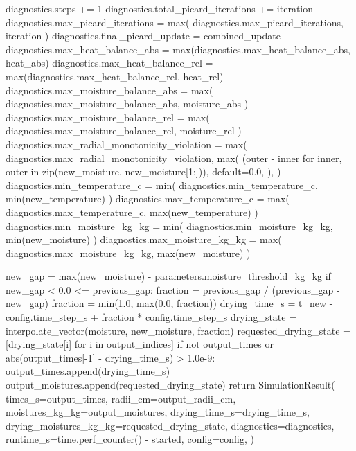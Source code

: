 \documentclass[withoutpreface,bwprint]{cumcmthesis}
\begin{document}
\begin{PythonCode}
        diagnostics.steps += 1
        diagnostics.total_picard_iterations += iteration
        diagnostics.max_picard_iterations = max(
            diagnostics.max_picard_iterations, iteration
        )
        diagnostics.final_picard_update = combined_update
        diagnostics.max_heat_balance_abs = max(diagnostics.max_heat_balance_abs, heat_abs)
        diagnostics.max_heat_balance_rel = max(diagnostics.max_heat_balance_rel, heat_rel)
        diagnostics.max_moisture_balance_abs = max(
            diagnostics.max_moisture_balance_abs, moisture_abs
        )
        diagnostics.max_moisture_balance_rel = max(
            diagnostics.max_moisture_balance_rel, moisture_rel
        )
        diagnostics.max_radial_monotonicity_violation = max(
            diagnostics.max_radial_monotonicity_violation,
            max(
                (outer - inner for inner, outer in zip(new_moisture, new_moisture[1:])),
                default=0.0,
            ),
        )
        diagnostics.min_temperature_c = min(
            diagnostics.min_temperature_c, min(new_temperature)
        )
        diagnostics.max_temperature_c = max(
            diagnostics.max_temperature_c, max(new_temperature)
        )
        diagnostics.min_moisture_kg_kg = min(
            diagnostics.min_moisture_kg_kg, min(new_moisture)
        )
        diagnostics.max_moisture_kg_kg = max(
            diagnostics.max_moisture_kg_kg, max(new_moisture)
        )

        new_gap = max(new_moisture) - parameters.moisture_threshold_kg_kg
        if new_gap < 0.0 <= previous_gap:
            fraction = previous_gap / (previous_gap - new_gap)
            fraction = min(1.0, max(0.0, fraction))
            drying_time_s = t_new - config.time_step_s + fraction * config.time_step_s
            drying_state = interpolate_vector(moisture, new_moisture, fraction)
            requested_drying_state = [drying_state[i] for i in output_indices]
            if not output_times or abs(output_times[-1] - drying_time_s) > 1.0e-9:
                output_times.append(drying_time_s)
                output_moistures.append(requested_drying_state)
            return SimulationResult(
                times_s=output_times,
                radii_cm=output_radii_cm,
                moistures_kg_kg=output_moistures,
                drying_time_s=drying_time_s,
                drying_moistures_kg_kg=requested_drying_state,
                diagnostics=diagnostics,
                runtime_s=time.perf_counter() - started,
                config=config,
            )


\end{PythonCode}
\end{document}
